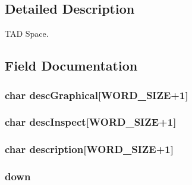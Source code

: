 \subsection{Detailed Description}
T\+A\+D Space. 


\begin{DoxyItemize}
\item 
\end{DoxyItemize}

\subsection{Field Documentation}
\hypertarget{struct___space_aeeb1a7cbcd065a4b3dd012ab2328718a}{
\subsubsection[{desc\+Graphical}]{\setlength{\rightskip}{0pt plus 5cm}char desc\+Graphical\mbox{[}{\bf W\+O\+R\+D\+\_\+\+S\+I\+Z\+E}+1\mbox{]}}}\label{struct___space_aeeb1a7cbcd065a4b3dd012ab2328718a}
\hypertarget{struct___space_a03234f00395c777593ac3f5b591b51ab}{
\subsubsection[{desc\+Inspect}]{\setlength{\rightskip}{0pt plus 5cm}char desc\+Inspect\mbox{[}{\bf W\+O\+R\+D\+\_\+\+S\+I\+Z\+E}+1\mbox{]}}}\label{struct___space_a03234f00395c777593ac3f5b591b51ab}
\hypertarget{struct___space_a986940b5717dab72fc54860fd6e0d5fd}{
\subsubsection[{description}]{\setlength{\rightskip}{0pt plus 5cm}char description\mbox{[}{\bf W\+O\+R\+D\+\_\+\+S\+I\+Z\+E}+1\mbox{]}}}\label{struct___space_a986940b5717dab72fc54860fd6e0d5fd}
\hypertarget{struct___space_aa3463207bb8fc71e226ecd0477adbca5}{
\subsubsection[{down}]{ down}}\label{struct___space_aa3463207bb8fc71e226ecd0477adbca5}
